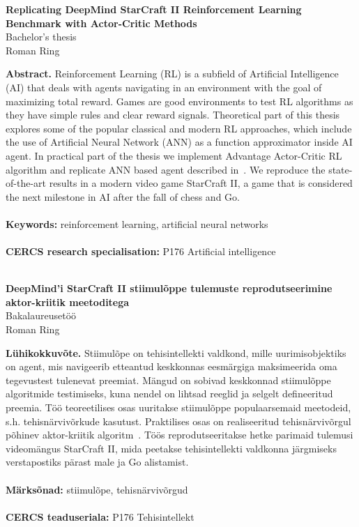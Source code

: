 \newpage

\begin{center}
\textbf{Replicating DeepMind StarCraft II Reinforcement Learning Benchmark with Actor-Critic Methods}\\
Bachelor’s thesis\\
Roman Ring\\
\end{center}

\noindent 
\textbf{Abstract.} Reinforcement Learning (RL) is a subfield of Artificial Intelligence (AI) that deals with agents navigating in an environment with the goal of maximizing total reward. Games are good environments to test RL algorithms as they have simple rules and clear reward signals. Theoretical part of this thesis explores some of the popular classical and modern RL approaches, which include the use of Artificial Neural Network (ANN) as a function approximator inside AI agent. In practical part of the thesis we implement Advantage Actor-Critic RL algorithm and replicate ANN based agent described in~\cite{Vinyals2017}. We reproduce the state-of-the-art results in a modern video game StarCraft II, a game that is considered the next milestone in AI after the fall of chess and Go.
\\\\
\textbf{Keywords:} reinforcement learning, artificial neural networks 
\\\\
\textbf{CERCS research specialisation:} P176 Artificial intelligence
\\\\
\begin{center}
\textbf{DeepMind'i StarCraft II stiimulõppe tulemuste reprodutseerimine aktor-kriitik meetoditega}\\
Bakalaureusetöö\\
Roman Ring\\
\end{center}

\noindent 
\textbf{Lühikokkuvõte.} Stiimulõpe on tehisintellekti valdkond, mille uurimisobjektiks on agent, mis navigeerib etteantud keskkonnas eesmärgiga maksimeerida oma tegevustest tulenevat preemiat. Mängud on sobivad keskkonnad stiimulõppe algoritmide testimiseks, kuna nendel on lihtsad reeglid ja selgelt defineeritud preemia. Töö teoreetilises osas uuritakse stiimulõppe populaarsemaid meetodeid, s.h. tehisnärvivõrkude kasutust. Praktilises osas on realiseeritud tehisnärvivõrgul põhinev aktor-kriitik algoritm~\cite{Vinyals2017}. Töös reprodutseeritakse hetke parimaid tulemusi videomängus StarCraft II, mida peetakse tehisintellekti valdkonna järgmiseks verstapostiks pärast male ja Go alistamist. %
\\\\
\textbf{Märksõnad:} stiimulõpe, tehisnärvivõrgud
\\\\
\textbf{CERCS teaduseriala:} P176 Tehisintellekt

\pagebreak
